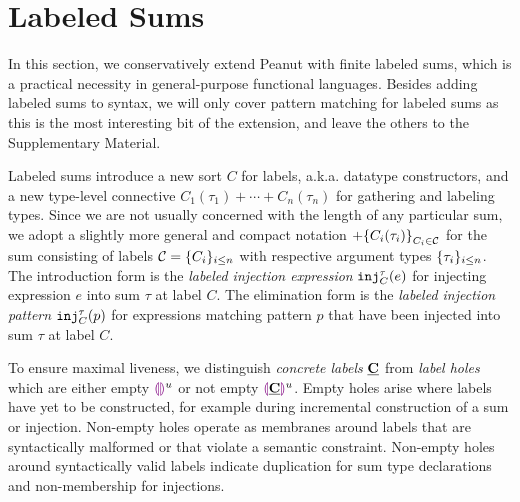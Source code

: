 \section{Labeled Sums}\label{sec:labeledsums}

In this section, we conservatively extend Peanut with finite labeled
sums, which is a practical necessity in general-purpose functional
languages. Besides adding labeled sums to syntax, we will only cover
pattern matching for labeled sums as this is the most interesting bit
of the extension, and leave the others to the Supplementary Material.

Labeled sums introduce a new sort $C$ for labels, a.k.a. datatype constructors, and a new type-level connective $C_1(\tau_1) + \cdots + C_n(\tau_n)$ for gathering and labeling types.
Since we are not usually concerned with the length of any particular sum,
we adopt a slightly more general and compact notation $+\mathopen{}\left\{C_i(\tau_i)\right\}_{C_i \in \mathcal{C}}$
for the sum consisting of labels $\mathcal{C} = \{C_i\}_{i \leq n}$ with respective argument types $\{\tau_i\}_{i \leq n}$.
The introduction form is the \emph{labeled injection expression} $\mathtt{inj}_{C}^{\tau}({e})$ for injecting expression $e$ into sum $\tau$ at label $C$.
The elimination form is the \emph{labeled injection pattern} $\mathtt{inj}_{C}^{\tau}({p})$ 
for expressions matching pattern $p$ that have been injected into sum $\tau$ at label $C$.

To ensure maximal liveness, we distinguish \emph{concrete labels} $\underline{\mathbf{C}}$
from \emph{label holes} which are either empty $\textcolor{violet}{\llparenthesis}\textcolor{violet}{\rrparenthesis}^{u}$ or not empty $\textcolor{violet}{\llparenthesis}\underline{\mathbf{C}}\textcolor{violet}{\rrparenthesis}^{u}$.
Empty holes arise where labels have yet to be constructed, for example during incremental construction of a sum or injection.
Non-empty holes operate as membranes around labels that are syntactically malformed or that violate a semantic constraint.
Non-empty holes around syntactically valid labels indicate duplication for sum type declarations and non-membership for injections.



